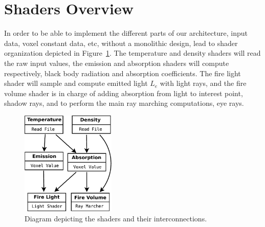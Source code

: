 \section{Shaders Overview}
\label{sec:shaders_overview}

In order to be able to implement the different parts of our architecture, input data, voxel constant data, etc, without a monolithic design, lead to shader organization depicted in Figure~\ref{fig:shaders_diagram}.
The temperature and density shaders will read the raw input values, the emission and absorption shaders will compute respectively, black body radiation and absorption coefficients.
The fire light shader will sample and compute emitted light $L_e$ with light rays, and the fire volume shader is in charge of adding absorption from light to interest point, shadow rays, and to perform the main ray marching computations, eye rays. 

\begin{figure}[htbp!]
	\centering
	\includegraphics[width=0.4\textwidth]{img/shaders_diagram}
	\caption{Diagram depicting the shaders and their interconnections.}
	\label{fig:shaders_diagram}
\end{figure}

